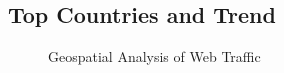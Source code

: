 \subsection{Top Countries and Trend} \label{vizcountries}


\begin{figure}
\centering
{}
\caption{Geospatial Analysis of Web Traffic}
\label{fig:TopCountries}
\end{figure}

